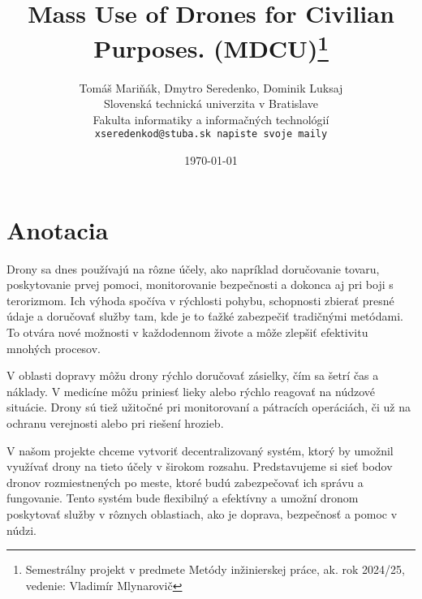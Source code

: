 \documentclass[10pt,a4paper]{article}
\title{Mass Use of Drones for Civilian Purposes. (\textbf{MDCU})\thanks{Semestrálny projekt v predmete Metódy inžinierskej práce, ak. rok 2024/25, vedenie: Vladimír Mlynarovič}}
\author{Tomáš Mariňák, Dmytro Seredenko, Dominik Luksaj\\[2pt]
	{\small Slovenská technická univerzita v Bratislave}\\
	{\small Fakulta informatiky a informačných technológií}\\
	{\small \texttt{xseredenkod@stuba.sk napiste svoje maily}}}
\date{\small \today}
\begin{document}
\maketitle

\section{Anotacia}

 Drony sa dnes používajú na rôzne účely, ako napríklad doručovanie tovaru, poskytovanie prvej pomoci, monitorovanie bezpečnosti a dokonca aj pri boji s terorizmom. Ich výhoda spočíva v rýchlosti pohybu, schopnosti zbierať presné údaje a doručovať služby tam, kde je to ťažké zabezpečiť tradičnými metódami. To otvára nové možnosti v každodennom živote a môže zlepšiť efektivitu mnohých procesov.

 V oblasti dopravy môžu drony rýchlo doručovať zásielky, čím sa šetrí čas a náklady. V medicíne môžu priniesť lieky alebo rýchlo reagovať na núdzové situácie. Drony sú tiež užitočné pri monitorovaní a pátracích operáciách, či už na ochranu verejnosti alebo pri riešení hrozieb.

 V našom projekte chceme vytvoriť decentralizovaný systém, ktorý by umožnil využívať drony na tieto účely v širokom rozsahu. Predstavujeme si sieť bodov dronov rozmiestnených po meste, ktoré budú zabezpečovať ich správu a fungovanie. Tento systém bude flexibilný a efektívny a umožní dronom poskytovať služby v rôznych oblastiach, ako je doprava, bezpečnosť a pomoc v núdzi.
\end{document}
